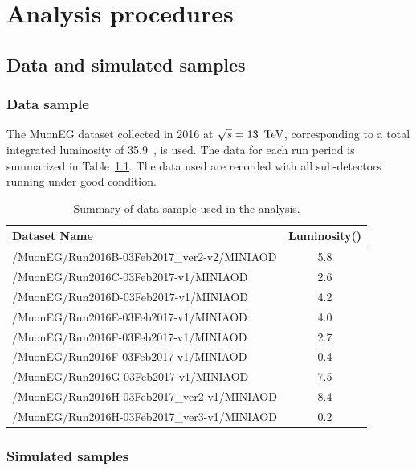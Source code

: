 \chapter{Analysis procedures}  
\label{Chap:Ana}
	\section{Data and simulated samples}
		\subsection{Data sample}
		The MuonEG dataset collected in 2016 at $\sqrt{s}=13~\,\text{Te\hspace{-.08em}V}$, corresponding to a total integrated luminosity of 35.9~\fbinv , is used. The data for each run period is summarized in Table~\ref{tab:datasample}. The data used are recorded with all sub-detectors running under good condition. 
		\begin{table}[!ht]
		  \begin{center}
		    \begin{tabular}{|l|c|}
		      \hline
		      Dataset Name                                & Luminosity(\fbinv)                       \\ \hline
		      /MuonEG/Run2016B-03Feb2017\_ver2-v2/MINIAOD   & 5.8     \\
		      /MuonEG/Run2016C-03Feb2017-v1/MINIAOD   & 2.6     \\
		      /MuonEG/Run2016D-03Feb2017-v1/MINIAOD   & 4.2     \\
		      /MuonEG/Run2016E-03Feb2017-v1/MINIAOD   & 4.0     \\
		      /MuonEG/Run2016F-03Feb2017-v1/MINIAOD   & 2.7     \\
		      /MuonEG/Run2016F-03Feb2017-v1/MINIAOD   & 0.4     \\
		      /MuonEG/Run2016G-03Feb2017-v1/MINIAOD   & 7.5     \\
		      /MuonEG/Run2016H-03Feb2017\_ver2-v1/MINIAOD   & 8.4     \\
		      /MuonEG/Run2016H-03Feb2017\_ver3-v1/MINIAOD   & 0.2      \\
		      \hline
		    \end{tabular}
		    \caption{Summary of data sample used in the analysis.\label{tab:datasample}}
		  \end{center}
		\end{table}
		
		\subsection{Simulated samples}
